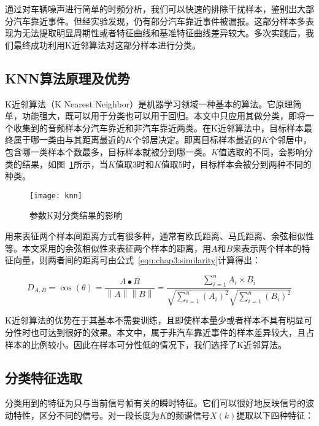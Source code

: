 通过对车辆噪声进行简单的时频分析，我们可以快速的排除干扰样本，鉴别出大部分汽车靠近事件。但经实验发现，仍有部分汽车靠近事件被漏报。这部分样本多表现为无法提取明显周期性或者特征曲线和基准特征曲线差异较大。多次实践后，我们最终成功利用K近邻算法对这部分样本进行分类。

\subsection{KNN算法原理及优势}

K近邻算法（K Nearest Neighbor）是机器学习领域一种基本的算法。它原理简单，功能强大，既可以用于分类也可以用于回归。本文中只应用其做分类，即将一个收集到的音频样本分汽车靠近和非汽车靠近两类。在K近邻算法中，目标样本最终属于哪一类由与其距离最近的$K$个邻居决定。即离目标样本最近的$K$个邻居中，包含哪一类样本个数最多，目标样本就被分到哪一类。$K$值选取的不同，会影响分类的结果，如图~\ref{fig:knn}所示，当$K$值取3时和$K$值取5时，目标样本会被分到两种不同的种类。


\begin{figure}[htbp] %
  \centering
  \texttt{[image: knn]}
  \caption{参数K对分类结果的影响}
  \label{fig:knn}
\end{figure}


用来表征两个样本间距离方式有很多种，通常有欧氏距离、马氏距离、余弦相似性等。本文采用的余弦相似性来表征两个样本的距离，用$A$和$B$来表示两个样本的特征向量，则两者间的距离可由公式~\ref{equ:chap3:similarity}计算得出：

\begin{equation}
\label{equ:chap3:similarity}
{D_{A,B}} = \cos \left( \theta  \right) = \frac{{A \bullet B}}{{\left\| A \right\|\left\| B \right\|}} = \frac{{\sum\limits_{i = 1}^n {{A_i} \times {B_i}} }}{{\sqrt {\sum\limits_{i = 1}^n {{{\left( {{A_i}} \right)}^2}} } \sqrt {\sum\limits_{i = 1}^n {{{\left( {{B_i}} \right)}^2}} } }}
\end{equation}


K近邻算法的优势在于其基本不需要训练，且即使样本量少或者样本不具有明显可分性时也可达到很好的效果。本文中，属于非汽车靠近事件的样本差异较大，且占样本的比例较小。因此在样本可分性低的情况下，我们选择了K近邻算法。

\subsection{分类特征选取}
分类用到的特征为只与当前信号帧有关的瞬时特征。它们可以很好地反映信号的波动特性，区分不同的信号。对一段长度为$K$的频谱信号$X(k)$提取以下四种特征：

